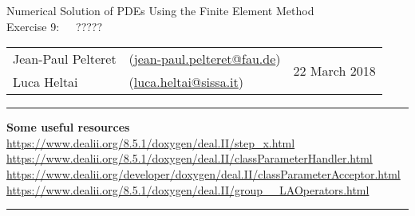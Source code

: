 \documentclass[11pt]{exam}
\makeatletter
\newcommand{\makeheader}[3]{%
\setcounter{question}{0}
\begin{center}
{\sc Numerical Solution of PDEs Using the Finite Element Method}\vspace{2ex}\\
{\sc Exercise #1:\ \ \ #2}\vspace{2ex}\\
\begin{tabular*}{\textwidth}{ll @{\extracolsep{\fill}}r}
Jean-Paul Pelteret & (\url{jean-paul.pelteret@fau.de}) & \multirow{2}{*}{#3} \\
Luca Heltai & (\url{luca.heltai@sissa.it}) & \\
\end{tabular*}
\end{center}
}
\newcommand{\makeresources}[1]{%
\rule{\textwidth}{0.6mm}
\textbf{Some useful resources}\\[1.5ex]
#1 \par
\rule{\textwidth}{0.6mm}
}
\makeatother
\begin{document}
%
%
%
%
%
%




\clearpage
\makeheader{9}{?????}{22 March 2018}
\makeresources{%
\url{https://www.dealii.org/8.5.1/doxygen/deal.II/step_x.html} \\
\url{https://www.dealii.org/8.5.1/doxygen/deal.II/classParameterHandler.html} \\
\url{https://www.dealii.org/developer/doxygen/deal.II/classParameterAcceptor.html} \\
\url{https://www.dealii.org/8.5.1/doxygen/deal.II/group__LAOperators.html}
}
\end{document}
